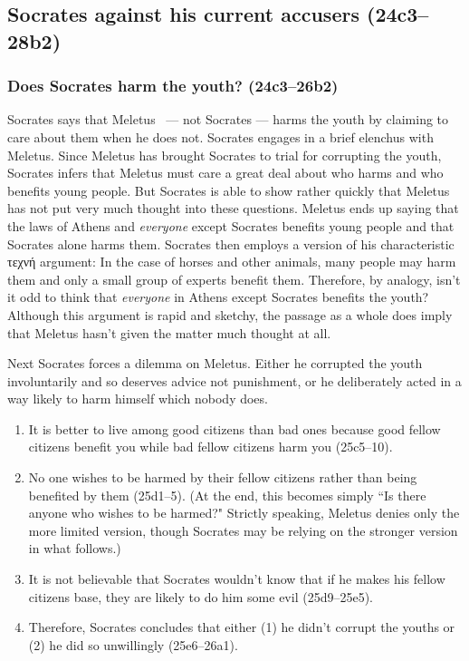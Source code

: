 \documentclass[11pt]{article}
\begin{document}


\subsection{Socrates against his current accusers (24c3--28b2)}

\subsubsection{Does Socrates harm the youth? (24c3--26b2)}

Socrates says that Meletus ~--- not Socrates --- harms the youth by claiming to care about them when he does not. Socrates engages in a brief elenchus with Meletus.  Since Meletus has brought Socrates to trial for corrupting the youth, Socrates infers that Meletus must care a great deal about who harms and who benefits young people. But Socrates is able to show rather quickly that Meletus has not put very much thought into these questions.  Meletus ends up saying that the laws of Athens and \emph{everyone} except Socrates benefits young people and that Socrates alone harms them.  Socrates then employs a version of his characteristic τεχνή argument: In the case of horses and other animals, many people may harm them and only a small group of experts benefit them. Therefore, by analogy, isn't it odd to think that \emph{everyone} in Athens except Socrates benefits the youth?  Although this argument is rapid and sketchy, the passage as a whole does imply that Meletus hasn't given the matter much thought at all.

Next Socrates forces a dilemma on Meletus. Either he corrupted the youth involuntarily and so deserves advice not punishment, or he deliberately acted in a way likely to harm himself which nobody does.

\begin{enumerate}
    \item It is better to live among good citizens than bad ones because good fellow citizens benefit you while bad fellow citizens harm you (25c5--10).
    \item No one wishes to be harmed by their fellow citizens rather than being benefited by them (25d1--5). (At the end, this becomes simply ``Is there anyone who wishes to be harmed?" Strictly speaking, Meletus denies only the more limited version, though Socrates may be relying on the stronger version in what follows.)
    \item It is not believable that Socrates wouldn't know that if he makes his fellow citizens base, they are likely to do him some evil (25d9--25e5).
    \item Therefore, Socrates concludes that either (1) he didn't corrupt the youths or (2) he did so unwillingly (25e6--26a1).
\end{enumerate}
\end{document}
